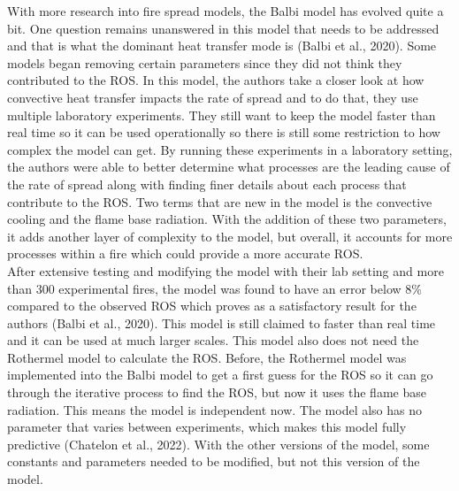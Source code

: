 \documentclass{article}
\begin{document}
\indent With more research into fire spread models, the Balbi model has evolved quite a bit. One question remains unanswered in this model that needs to be addressed and that is what the dominant heat transfer mode is (Balbi et al., 2020). Some models began removing certain parameters since they did not think they contributed to the ROS. In this model, the authors take a closer look at how convective heat transfer impacts the rate of spread and to do that, they use multiple laboratory experiments. They still want to keep the model faster than real time so it can be used operationally so there is still some restriction to how complex the model can get. By running these experiments in a laboratory setting, the authors were able to better determine what processes are the leading cause of the rate of spread along with finding finer details about each process that contribute to the ROS. Two terms that are new in the model is the convective cooling and the flame base radiation. With the addition of these two parameters, it adds another layer of complexity to the model, but overall, it accounts for more processes within a fire which could provide a more accurate ROS. \\
\indent After extensive testing and modifying the model with their lab setting and more than 300 experimental fires, the model was found to have an error below 8\% compared to the observed ROS which proves as a satisfactory result for the authors (Balbi et al., 2020). This model is still claimed to faster than real time and it can be used at much larger scales. This model also does not need the Rothermel model to calculate the ROS. Before, the Rothermel model was implemented into the Balbi model to get a first guess for the ROS so it can go through the iterative process to find the ROS, but now it uses the flame base radiation. This means the model is independent now. The model also has no parameter that varies between experiments, which makes this model fully predictive (Chatelon et al., 2022). With the other versions of the model, some constants and parameters needed to be modified, but not this version of the model. \\
\end{document}
